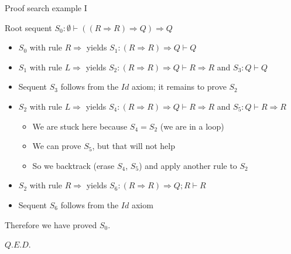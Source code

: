 \documentclass[english]{beamer}
\begin{document}
\begin{frame}{Proof search example I}

Root sequent $S_{0}:\emptyset\vdash\left(\left(R\Rightarrow R\right)\Rightarrow Q\right)\Rightarrow Q$
\begin{itemize}
\item $S_{0}$ with rule $R\Rightarrow$ yields $S_{1}:\left(R\Rightarrow R\right)\Rightarrow Q\vdash Q$
\item $S_{1}$ with rule $L\Rightarrow$ yields $S_{2}:\left(R\Rightarrow R\right)\Rightarrow Q\vdash R\Rightarrow R$
and $S_{3}:Q\vdash Q$
\item Sequent $S_{3}$ follows from the $Id$ axiom; it remains to prove
$S_{2}$
\item $S_{2}$ with rule $L\Rightarrow$ yields $S_{4}:\left(R\Rightarrow R\right)\Rightarrow Q\vdash R\Rightarrow R$
and $S_{5}:Q\vdash R\Rightarrow R$
\begin{itemize}
\item We are stuck here because $S_{4}=S_{2}$ (we are in a loop)
\item We can prove $S_{5}$, but that will not help
\item So we backtrack (erase $S_{4}$, $S_{5}$) and apply another rule
to $S_{2}$
\end{itemize}
\item $S_{2}$ with rule $R\Rightarrow$ yields $S_{6}:\left(R\Rightarrow R\right)\Rightarrow Q;R\vdash R$
\item Sequent $S_{6}$ follows from the $Id$ axiom
\end{itemize}
Therefore we have proved $S_{0}$.

$Q.E.D.$
\end{frame}
\end{document}
